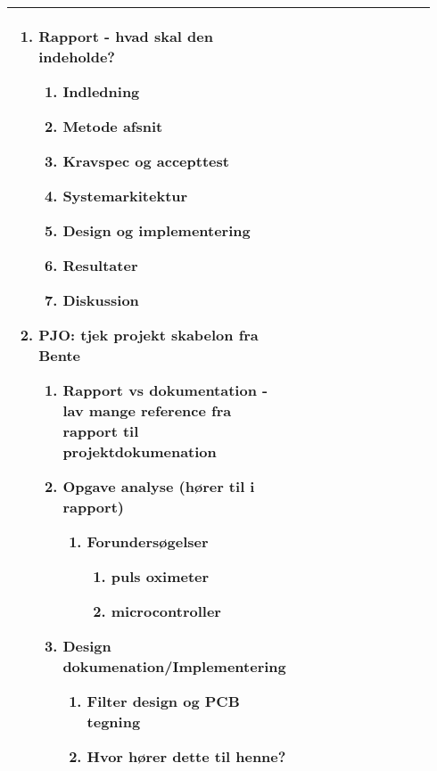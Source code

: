 \begin{longtable}{|p{0.24\linewidth}|p{0.7\linewidth}|}
\begin{enumerate}
\begin{enumerate}
\begin{enumerate}
				\end{enumerate}
			\end{enumerate}
			\item Rapport - hvad skal den indeholde?
			\begin{enumerate} 
				\item Indledning
				\item Metode afsnit
				\item Kravspec og accepttest
				\item Systemarkitektur
				\item Design og implementering
				\item Resultater 
				\item Diskussion
			\end{enumerate}
			\item PJO: tjek projekt skabelon fra Bente 
			\begin{enumerate}
				\item Rapport vs dokumentation - lav mange reference fra rapport til projektdokumenation 
				\item Opgave analyse (hører til i rapport) 
				\begin{enumerate}
					\item Forundersøgelser
					\begin{enumerate}
						\item puls oximeter
						\item microcontroller
					\end{enumerate}
				\end{enumerate}
			\item Design dokumenation/Implementering
			\begin{enumerate}
				\item Filter design og PCB tegning 
				\item Hvor hører dette til henne? 
			\end{enumerate}
		\end{enumerate}
	\end{enumerate}
		\\ \hline
	\end{longtable}
	
